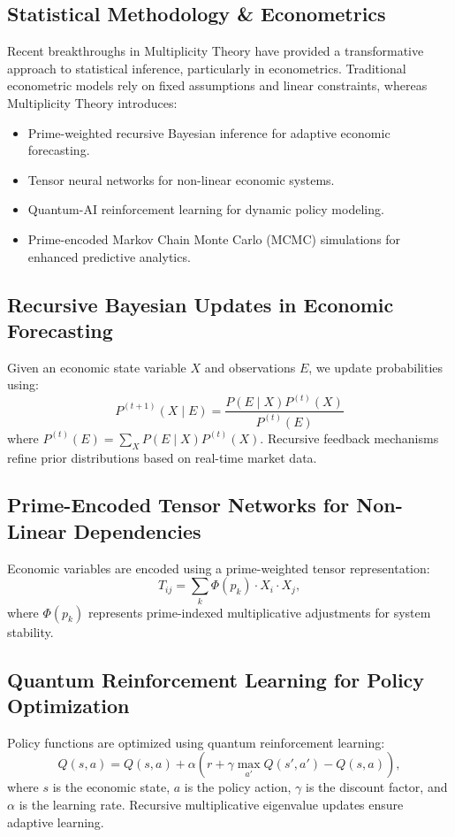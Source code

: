 \documentclass{article}
\theoremstyle{plain}
\begin{document}
\begin{itemize}
\begin{itemize}
\section{Statistical Methodology \& Econometrics}
Recent breakthroughs in Multiplicity Theory have provided a transformative approach to statistical inference, particularly in econometrics. Traditional econometric models rely on fixed assumptions and linear constraints, whereas Multiplicity Theory introduces:
\begin{itemize}
    \item Prime-weighted recursive Bayesian inference for adaptive economic forecasting.
    \item Tensor neural networks for non-linear economic systems.
    \item Quantum-AI reinforcement learning for dynamic policy modeling.
    \item Prime-encoded Markov Chain Monte Carlo (MCMC) simulations for enhanced predictive analytics.
\end{itemize}

\subsection{Recursive Bayesian Updates in Economic Forecasting}
Given an economic state variable $X$ and observations $E$, we update probabilities using:
\begin{equation}
    P^{(t+1)}(X \mid E) = \frac{P(E \mid X) P^{(t)}(X)}{P^{(t)}(E)}
\end{equation}
where $P^{(t)}(E) = \sum_X P(E \mid X) P^{(t)}(X)$. Recursive feedback mechanisms refine prior distributions based on real-time market data.

\subsection{Prime-Encoded Tensor Networks for Non-Linear Dependencies}
Economic variables are encoded using a prime-weighted tensor representation:
\begin{equation}
    T_{ij} = \sum_k \Phi(p_k) \cdot X_i \cdot X_j,
\end{equation}
where $\Phi(p_k)$ represents prime-indexed multiplicative adjustments for system stability.

\subsection{Quantum Reinforcement Learning for Policy Optimization}
Policy functions are optimized using quantum reinforcement learning:
\begin{equation}
    Q(s, a) = Q(s, a) + \alpha \left( r + \gamma \max_{a'} Q(s', a') - Q(s, a) \right),
\end{equation}
where $s$ is the economic state, $a$ is the policy action, $\gamma$ is the discount factor, and $\alpha$ is the learning rate. Recursive multiplicative eigenvalue updates ensure adaptive learning.


\end{itemize}
\end{itemize}
\end{document}

